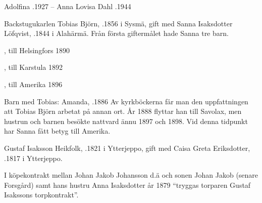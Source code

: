 Adolfina .1927  --  Anna Lovisa Dahl .1944


Backstugukarlen Tobias Björn, .1856 i Sysmä, gift med Sanna Isaksdotter Löfqvist, .1844 i Alahärmä.
Från första giftermålet hade Sanna tre barn.
\begin{jhchildren}
  \item {}, till Helsingfors 1890
  \item {}, till Karstula 1892
  \item {}, till Amerika 1896
\end{jhchildren}

Barn med Tobias: Amanda, .1886
Av kyrkböckerna får man den uppfattningen att Tobias Björn arbetat på annan ort. År 1888 flyttar han till Savolax, men hustrun och barnen besökte nattvard ännu 1897 och 1898. Vid denna tidpunkt har Sanna fått betyg till Amerika.


Gustaf Isaksson Heikfolk, .1821 i Ytterjeppo, gift med Caisa Greta Eriksdotter, .1817 i Ytterjeppo.
\begin{jhchildren}
  \item {}
  \item {}
  \item {}
  \item {}
  \item {}
  \item {}
  \item {}
  \item {}
  \item {}
\end{jhchildren}
I köpekontrakt mellan Johan Jakob Johansson d.ä och sonen Johan Jakob (senare Forsgård) samt hans hustru Anna Isaksdotter år 1879 ``tryggas torparen Gustaf Isakssons torpkontrakt''.




